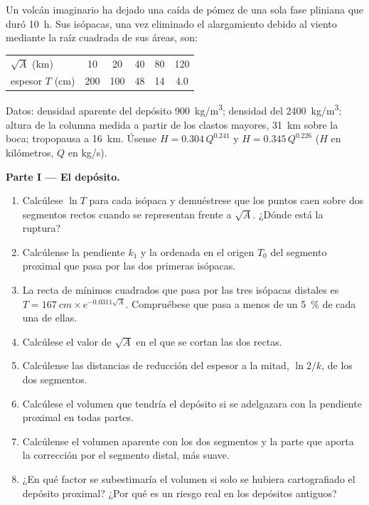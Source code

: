 \begin{problem}
\label{pb:b2:eruptive-styles:1}
Un volcán imaginario ha dejado una caída de pómez de una sola fase pliniana que
duró \qty{10}{\hour}. Sus isópacas, una vez eliminado el alargamiento debido al viento
mediante la raíz cuadrada de sus áreas, son:
\begin{center}
\small
\begin{tabular}{lccccc}
\hline
$\sqrt A$ (\unit{km}) & 10 & 20 & 40 & 80 & 120 \\
espesor $T$ (\unit{cm}) & 200 & 100 & 48 & 14 & 4.0 \\
\hline
\end{tabular}
\end{center}
Datos: densidad aparente del depósito \qty{900}{kg/m^3}; densidad del 
\qty{2400}{kg/m^3}; altura de la columna medida a partir de los clastos mayores,
\qty{31}{km} sobre la boca; tropopausa a \qty{16}{km}. Úsense $H =
0.304\,Q^{0.241}$ y $H = 0.345\,Q^{0.226}$ ($H$ en kilómetros, $Q$ en
\unit{kg/s}).

\medskip\noindent\textbf{Parte I --- El depósito.}
\begin{enumerate}
\item Calcúlese $\ln T$ para cada isópaca y demuéstrese que los puntos caen sobre dos
segmentos rectos cuando se representan frente a $\sqrt A$. ¿Dónde está la ruptura?
\item Calcúlense la pendiente $k_1$ y la ordenada en el origen $T_0$ del segmento proximal
que pasa por las dos primeras isópacas.
\item La recta de mínimos cuadrados que pasa por las tres isópacas distales es $T =
\qty{167}{cm}\times e^{-0.0311\sqrt A}$. Compruébese que pasa a menos de un
\qty{5}{\percent} de cada una de ellas.
\item Calcúlese el valor de $\sqrt A$ en el que se cortan las dos rectas.
\item Calcúlense las distancias de reducción del espesor a la mitad, $\ln 2/k$, de los dos segmentos.
\item Calcúlese el volumen que tendría el depósito si se adelgazara con la pendiente proximal
en todas partes.
\item Calcúlense el volumen aparente con los dos segmentos y la parte que aporta
la corrección por el segmento distal, más suave.
\item ¿En qué factor se subestimaría el volumen si solo se hubiera cartografiado el depósito
proximal? ¿Por qué es un riesgo real en los depósitos antiguos?
\end{enumerate}


\end{problem}
